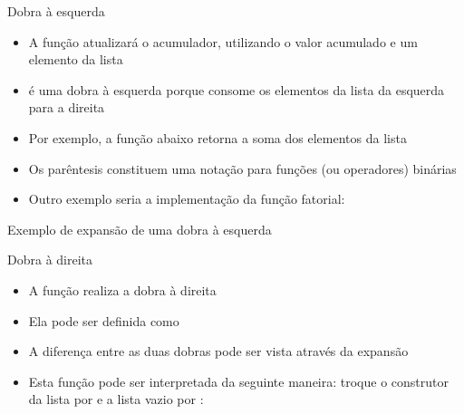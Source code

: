 \begin{frame}[fragile]{Dobra à esquerda}

    \begin{itemize}
        \item A função  atualizará o acumulador, utilizando o valor acumulado
            e um elemento da lista

        \item {} é uma dobra à esquerda porque consome os elementos da lista
            da esquerda para a direita

        \item Por exemplo, a função  abaixo retorna a soma dos elementos
            da lista 


        \item Os parêntesis constituem uma notação para funções (ou operadores) binárias

        \item Outro exemplo seria a implementação da função fatorial:

    \end{itemize}

\end{frame}

\begin{frame}[fragile]{Exemplo de expansão de uma dobra à esquerda}
\end{frame}

\begin{frame}[fragile]{Dobra à direita}

    \begin{itemize}
        \item A função  realiza a dobra à direita

        \item Ela pode ser definida como


        \item A diferença entre as duas dobras pode ser vista através da expansão 


        \item Esta função pode ser interpretada da seguinte maneira: troque o construtor da
            lista por  e a lista vazio por :

    \end{itemize}

\end{frame}

